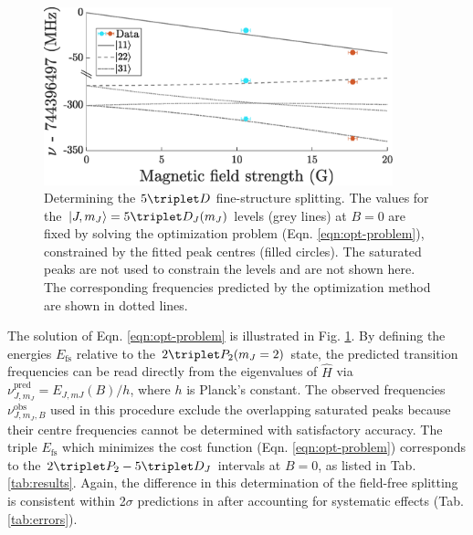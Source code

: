 	\begin{figure}
	\centering
		\includegraphics[width=0.9\textwidth]{fig/spectroscopy/fitting-lines}
		\caption{Determining the $5\triplet D$ fine-structure splitting.
		The values for the $|J,m_J\rangle=5\triplet D_J(m_J)$ levels (grey lines) at $B=0$ are fixed by solving the optimization problem (Eqn.
		\ref{eqn:opt-problem}), constrained by the fitted peak centres (filled circles).
		The saturated peaks are not used to constrain the levels and are not shown here. \com{}
		The corresponding frequencies predicted by the optimization method are shown in dotted lines.}
	    \label{fig:fitting_3D}
	\end{figure}

	The solution of Eqn.
	\ref{eqn:opt-problem} is illustrated in Fig.
	\ref{fig:fitting_3D}.
	By defining the energies $E_{\textrm{fs}}$ relative to the $2\triplet P_2(m_J=2)$ state,  the predicted transition frequencies can be read directly from the eigenvalues of $\hat{H}$ via $\nu_{J,m_J}^{\textrm{pred}}=E_{J,mJ}(B)/h$, where $h$ is Planck's constant.
	The observed frequencies $\nu_{J,m_J,B}^{\textrm{obs}}$ used in this procedure exclude the overlapping saturated peaks because their centre frequencies cannot be determined with satisfactory accuracy.
	The triple $E_{\textrm{fs}}$ which minimizes the cost function (Eqn.
	\ref{eqn:opt-problem}) corresponds to the $2\triplet P_2 - 5\triplet D_J$ intervals at $B=0$, as listed in Tab.
	\ref{tab:results}.
	Again, the difference in this determination of the field-free splitting is consistent within 2$\sigma$ predictions in \cite{Drake07} after accounting for systematic effects (Tab.
	\ref{tab:errors}).
	






